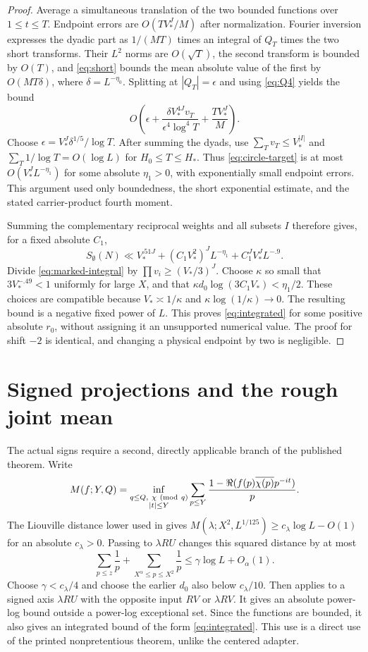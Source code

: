 \documentclass[11pt]{article}
\theoremstyle{remark}\newtheorem{remark}[theorem]{Remark}
\begin{document}
\begin{proof}
Average a simultaneous translation of the two bounded functions over
$1\le t\le T$. Endpoint errors are $O(TV_*^J/M)$ after normalization.
Fourier inversion expresses the dyadic part as
$1/(MT)$ times an integral of $Q_T$ times the two short transforms.
Their $L^2$ norms are $O(\sqrt T)$, the second transform is bounded
by $O(T)$, and \eqref{eq:short} bounds the mean absolute value of
the first by $O(MT\delta)$, where $\delta=L^{-\eta_0}$.
Splitting at $|Q_T|=\epsilon$ and using \eqref{eq:Q4} yields the bound
\[
 O\left(\epsilon+
     \frac{\delta V_*^{4J}v_T}{\epsilon^4\log^4T}
     +\frac{TV_*^J}{M}\right).
\]
Choose $\epsilon=V_*^J\delta^{1/5}/\log T$.
After summing the dyads, use
$\sum_Tv_T\le V_*^{|I|}$ and
$\sum_T1/\log T=O(\log L)$ for $H_0\le T\le H_*$.
Thus \eqref{eq:circle-target} is at most
$O(V_*^J L^{-\eta_1})$ for some absolute $\eta_1>0$,
with exponentially small endpoint errors. This argument used only
boundedness, the short exponential estimate, and the stated
carrier-product fourth moment.

Summing the complementary reciprocal weights and all subsets $I$
therefore gives, for a fixed absolute $C_1$,
\[
 S_{\emptyset}(N)\ll V_*^{.51J}
          +(C_1V_*^2)^J L^{-\eta_1}
          +C_1^J V_*^J L^{-.9}.
\]
Divide \eqref{eq:marked-integral} by
$\prod v_i\ge(V_*/3)^J$.
Choose $\kappa$ so small that $3V_*^{-.49}<1$ uniformly for large
$X$, and that $\kappa d_0\log(3C_1V_*)<\eta_1/2$.
These choices are compatible because $V_*\asymp1/\kappa$ and
$\kappa\log(1/\kappa)\to0$. The resulting bound is a negative
fixed power of $L$. This proves \eqref{eq:integrated} for some
positive absolute $r_0$, without assigning it an unsupported numerical
value. The proof for shift $-2$ is identical, and changing a physical
endpoint by two is negligible.
\end{proof}

\section{Signed projections and the rough joint mean}
The actual signs require a second, directly applicable branch of the
published theorem. Write
\[
 M(f;Y,Q)=\inf_{\substack{q\le Q,\ \chi\ ({\rm mod}\ q)\\|t|\le Y}}
                   \sum_{p\le Y}\frac{1-\Re(f(p)\overline{\chi(p)}p^{-it})}{p}.
\]
The Liouville distance lower used in \cite[Remarks 3.2]{tt} gives
$M(\lambda;X^2,L^{1/125})\ge c_\lambda\log L-O(1)$ for an absolute
$c_\lambda>0$. Passing to $\lambda RU$ changes this squared distance
by at most
\[
 \sum_{p\le z}\frac1p+\sum_{X^\alpha\le p\le X^2}\frac1p
                    \le\gamma\log L+O_\alpha(1).
\]
Choose $\gamma<c_\lambda/4$ and choose the earlier $d_0$ also below
$c_\lambda/10$. Then \cite[Theorem 3.1(ii)]{tt} applies to a signed
axis $\lambda RU$ with the opposite input $RV$ or $\lambda RV$.
It gives an absolute power-log bound outside a power-log exceptional
set. Since the functions are bounded, it also gives an integrated
bound of the form \eqref{eq:integrated}. This use is a direct use of
the printed nonpretentious theorem, unlike the centered adapter.
\end{document}
